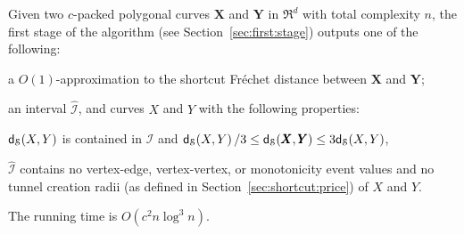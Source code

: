 \documentclass[12pt]{article}
\newcommand{\secref}[1]{Section~\ref{sec:#1}}
\newcommand{\lemlab}[1]{\label{lemma:#1}}
\newcommand{\Frechet}{Fr\'{e}c{h}e{}t\xspace}\providecommand{\Arr}{\mathop{\mathrm{\EuScript{A}}}}
\newcommand{\distoSFr}[2]{\mathsf{d}_{\EuScript{S}}\pth{#1,#2}}
\newcommand{\SimplifyX}[1]{#1}
\newcommand{\cXBase}{X} \newcommand{\cYBase}{Y} \newcommand{\crvCBase}{{\pi}}
\newcommand{\cX}{\SimplifyX{\cXBase}}
\newcommand{\cXOrig}{\pmb{\cXBase}}
\newcommand{\cY}{\SimplifyX{\cYBase}}
\newcommand{\cYOrig}{\pmb{\cYBase}}
\providecommand{\pth}[2][\!]{#1\left({#2}\right)}
\newcommand{\tunnel}{tunnel\xspace}
\newcommand{\Interval}{\mathcal{I}}
\numberwithin{figure}{section}
\numberwithin{equation}{section}
\begin{document}
\begin{lemma}\lemlab{first:stage}Given two $c$-packed polygonal curves $\cXOrig$ and $\cYOrig$ in
    $\Re^d$ with total complexity $n$, the first stage of the
    algorithm (see \secref{first:stage}) outputs one of the following:
    \begin{compactenum}[(A)]
        \item a $O(1)$-approximation to the shortcut \Frechet distance
        between $\cXOrig$ and $\cYOrig$;
        \item an interval $\widehat{\Interval}$, and curves $\cX$ and
        $\cY$ with the following properties:
        \begin{compactenum}[(i)]
            \item $\distoSFr{\cX}{\cY}$ is contained in
            $\widehat{\Interval}$ and $\distoSFr{\cX}{\cY}/3 \leq
            \distoSFr{\cXOrig}{\cYOrig} \leq 3\distoSFr{\cX}{\cY}$,
            
            \item $\widehat{\Interval}$ contains no vertex-edge,
            vertex-vertex, or monotonicity event values and no \tunnel
            creation radii (as defined in \secref{shortcut:price}) of
            $\cX$ and $\cY$.
        \end{compactenum}
    \end{compactenum}
    The running time is $O\pth{ c^2 n \log^3 n}$.
\end{lemma}
\end{document}
